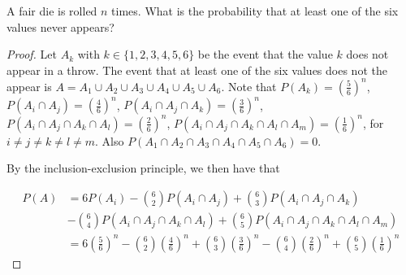 \begin{exercise}{49} A fair die is rolled $n$ times. What is the probability that at least one of the six values never appears?
\end{exercise}

\begin{proof}
    Let $A_k$ with $k \in \{1,2,3,4,5,6\}$ be the event that the value $k$ does not appear in a throw. The event that at least one of the six values does not the appear is $A = A_1 \cup A_2 \cup A_3 \cup A_4 \cup A_5 \cup A_6$. Note that $P(A_k) = (\frac{5}{6})^n$, $P(A_i \cap A_j) = (\frac{4}{6})^n$, $P(A_i \cap A_j \cap A_k) = (\frac{3}{6})^n$, $P(A_i \cap A_j \cap A_k \cap A_l) = (\frac{2}{6})^n$, $P(A_i \cap A_j \cap A_k \cap A_l \cap A_m) = (\frac{1}{6})^n$, for $i \neq j \neq k \neq l \neq m$. Also $P(A_1 \cap A_2 \cap A_3 \cap A_4 \cap A_5 \cap A_6) = 0$. 
        
    By the inclusion-exclusion principle, we then have that

    \begin{align*}
        P(A) &= 6P(A_i) - {6 \choose 2}P(A_i \cap A_j) + {6 \choose 3}P(A_i \cap A_j \cap A_k) \\
        & - {6 \choose 4}P(A_i \cap A_j \cap A_k \cap A_l) + {6 \choose 5}P(A_i \cap A_j \cap A_k \cap A_l \cap A_m) \\
        &= 6(\frac{5}{6})^n - {6 \choose 2}(\frac{4}{6})^n + {6 \choose 3}(\frac{3}{6})^n - {6 \choose 4}(\frac{2}{6})^n + {6 \choose 5}(\frac{1}{6})^n
    \end{align*}
    
\end{proof}


